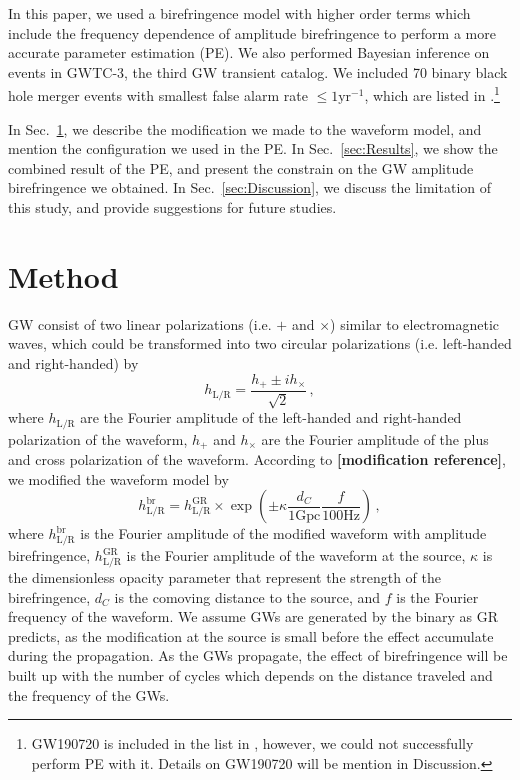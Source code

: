 \documentclass[reprint,amsmath,amssymb,aps,twocolumn]{aastex631}
\begin{document}
In this paper, we used a birefringence model with higher order terms which include the frequency dependence of amplitude birefringence to perform a more accurate parameter estimation (PE).
We also performed Bayesian inference on events in GWTC-3, the third GW transient catalog.
We included 70 binary black hole merger events with smallest false alarm rate $\leq1\mathrm{yr^{-1}}$, which are listed in \citet{GWTC_3_population}.\footnote{GW190720 is included in the list in \citet{GWTC_3_population}, however, we could not successfully perform PE with it. Details on GW190720 will be mention in Discussion.}

In Sec.~\ref{sec:Method}, we describe the modification we made to the waveform model, and mention the configuration we used in the PE.
In Sec.~\ref{sec:Results}, we show the combined result of the PE, and present the constrain on the GW amplitude birefringence we obtained.
In Sec.~\ref{sec:Discussion}, we discuss the limitation of this study, and provide suggestions for future studies.

\section{Method}
\label{sec:Method}

GW consist of two linear polarizations (i.e. $+$ and $\times$) similar to electromagnetic waves, which could be transformed into two circular polarizations (i.e. left-handed and right-handed) by
\begin{equation}
    h_{\mathrm{L/R}} = \frac{h_+ \pm i h_\times}{\sqrt{2}}\,,
\end{equation}
where $h_{\mathrm{L/R}}$ are the Fourier amplitude of the left-handed and right-handed polarization of the waveform, $h_+$ and $h_\times$ are the Fourier amplitude of the plus and cross polarization of the waveform.
According to \textbf{[modification reference]}, we modified the waveform model by
\begin{equation}
    h_\mathrm{L/R}^{\mathrm{br}}=
    h_\mathrm{L/R}^{\mathrm{GR}}\times
    \exp\left(\pm\kappa\frac{d_C}{1\mathrm{Gpc}}\frac{f}{100\mathrm{Hz}}\right)\,,
\end{equation}
where $h_\mathrm{L/R}^{\mathrm{br}}$ is the Fourier amplitude of the modified waveform with amplitude birefringence, $h_\mathrm{L/R}^{\mathrm{GR}}$ is the Fourier amplitude of the waveform at the source, $\kappa$ is the dimensionless opacity parameter that represent the strength of the birefringence, $d_C$ is the comoving distance to the source, and $f$ is the Fourier frequency of the waveform.
We assume GWs are generated by the binary as GR predicts, as the modification at the source is small before the effect accumulate during the propagation.
As the GWs propagate, the effect of birefringence will be built up with the number of cycles which depends on the distance traveled and the frequency of the GWs.
\end{document}
